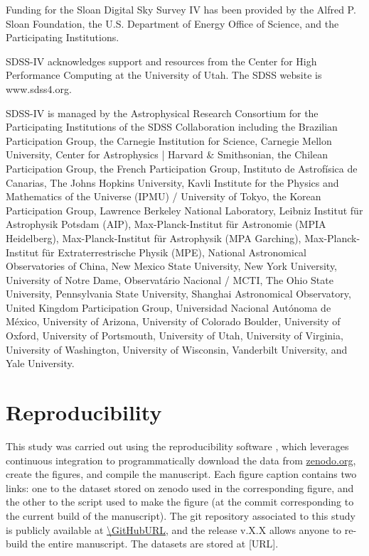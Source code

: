 \documentclass[twocolumn,linenumbers,twocolappendix]{aastex631}
\begin{document}
\begin{acknowledgments}

Funding for the Sloan Digital Sky 
Survey IV has been provided by the 
Alfred P. Sloan Foundation, the U.S. 
Department of Energy Office of 
Science, and the Participating 
Institutions. 

SDSS-IV acknowledges support and 
resources from the Center for High 
Performance Computing  at the 
University of Utah. The SDSS 
website is www.sdss4.org.

SDSS-IV is managed by the 
Astrophysical Research Consortium 
for the Participating Institutions 
of the SDSS Collaboration including 
the Brazilian Participation Group, 
the Carnegie Institution for Science, 
Carnegie Mellon University, Center for 
Astrophysics | Harvard \& 
Smithsonian, the Chilean Participation 
Group, the French Participation Group, 
Instituto de Astrof\'isica de 
Canarias, The Johns Hopkins 
University, Kavli Institute for the 
Physics and Mathematics of the 
Universe (IPMU) / University of 
Tokyo, the Korean Participation Group, 
Lawrence Berkeley National Laboratory, 
Leibniz Institut f\"ur Astrophysik 
Potsdam (AIP),  Max-Planck-Institut 
f\"ur Astronomie (MPIA Heidelberg), 
Max-Planck-Institut f\"ur 
Astrophysik (MPA Garching), 
Max-Planck-Institut f\"ur 
Extraterrestrische Physik (MPE), 
National Astronomical Observatories of 
China, New Mexico State University, 
New York University, University of 
Notre Dame, Observat\'ario 
Nacional / MCTI, The Ohio State 
University, Pennsylvania State 
University, Shanghai 
Astronomical Observatory, United 
Kingdom Participation Group, 
Universidad Nacional Aut\'onoma 
de M\'exico, University of Arizona, 
University of Colorado Boulder, 
University of Oxford, University of 
Portsmouth, University of Utah, 
University of Virginia, University 
of Washington, University of 
Wisconsin, Vanderbilt University, 
and Yale University.

\end{acknowledgments}

\appendix

\section{Reproducibility}
\label{app:reproducibility}

This study was carried out using the reproducibility software
\href{https://github.com/showyourwork/showyourwork}{\showyourwork}
\citep{Luger2021-showyourwork}, which leverages continuous integration to
programmatically download the data from
\href{https://zenodo.org/}{zenodo.org}, create the figures, and
compile the manuscript. Each figure caption contains two links: one
to the dataset stored on zenodo used in the corresponding figure,
and the other to the script used to make the figure (at the commit
corresponding to the current build of the manuscript). The git
repository associated to this study is publicly available at
\url{\GitHubURL}, and the release v.X.X allows anyone to re-build the entire 
manuscript. The datasets are stored at [URL].


\end{document}
